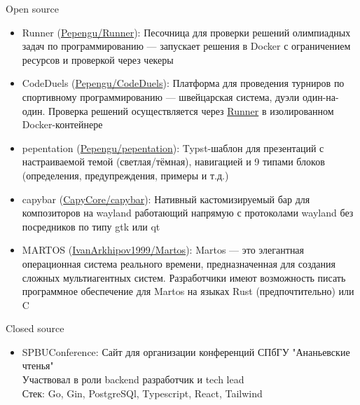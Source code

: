 \documentclass{cv}
\begin{document}
\begin{cvblock}{Open source}
	\begin{itemize}
        \item Runner
            (\href{https://github.com/Pepengu/Runner}{Pepengu/Runner}):
            Песочница для проверки решений олимпиадных задач по программированию —
            запускает решения в Docker с ограничением ресурсов и проверкой через чекеры
        \item CodeDuels
            (\href{https://github.com/Pepengu/CodeDuels}{Pepengu/CodeDuels}):
            Платформа для проведения турниров по спортивному программированию —
            швейцарская система, дуэли один-на-один. Проверка решений
            осуществляется через \href{https://github.com/Pepengu/Runner}{Runner}
            в изолированном Docker-контейнере
        \item pepentation
            (\href{https://github.com/Pepengu/pepentation}{Pepengu/pepentation}):
            Typst-шаблон для презентаций с настраиваемой темой (светлая/тёмная),
            навигацией и 9 типами блоков (определения, предупреждения, примеры и т.д.)
        \item capybar (\href{https://github.com/CapyCore/capybar}{CapyCore/capybar}): Нативный кастомизируемый бар для композиторов на wayland работающий напрямую с протоколами wayland без посредников по типу gtk или qt
		\item MARTOS
            (\href{https://github.com/IvanArkhipov1999/Martos}{IvanArkhipov1999/Martos}):
              Martos — это элегантная операционная система реального времени, предназначенная для создания сложных мультиагентных систем. Разработчики имеют возможность писать программное обеспечение для Martos на языках Rust (предпочтительно) или C
      \end{itemize}
\end{cvblock}

\begin{cvblock}{Closed source}
	\begin{itemize}
        \item SPBUConference:
            Сайт для организации конференций СПбГУ "Ананьевские чтенья" \\
            Участвовал в роли backend разработчик и tech lead \\
            Стек: Go, Gin, PostgreSQl, Typescript, React, Tailwind
      \end{itemize}
\end{cvblock}
\end{document}
